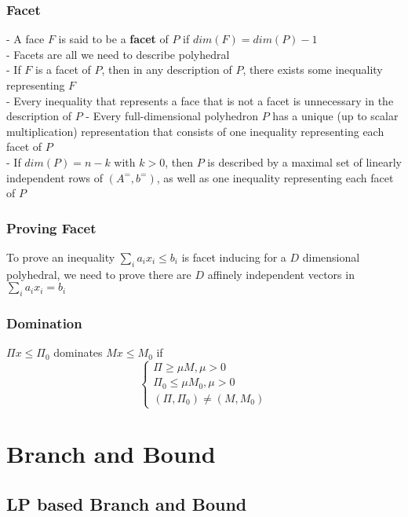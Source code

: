 			\subsection{Facet}
				- A face $F$ is said to be a \textbf{facet} of $P$ if $dim(F) = dim(P)-1$\\
				- Facets are all we need to describe polyhedral\\
				- If $F$ is a facet of $P$, then in any description of $P$, there exists some inequality representing $F$\\
				- Every inequality that represents a face that is not a facet is unnecessary in the description of $P$
				- Every full-dimensional polyhedron $P$ has a unique (up to scalar multiplication) representation that consists of one inequality representing each facet of $P$\\
				- If $dim(P) = n-k$ with $k>0$, then $P$ is described by a maximal set of linearly independent rows of $(A^=, b^=)$, as well as one inequality representing each facet of $P$

			\subsection{Proving Facet}
				To prove an inequality $\sum_i a_i x_i \le b_i$ is facet inducing for a $D$ dimensional polyhedral, we need to prove there are $D$ affinely independent vectors in $\sum_i a_i x_i = b_i$

			\subsection{Domination}
				$\Pi x\le \Pi_0$ dominates $Mx\le M_0$ if
				\begin{equation}
					\begin{cases}
						\Pi \ge \mu M, \mu > 0\\
						\Pi_0 \le \mu M_0, \mu > 0\\
						(\Pi, \Pi_0) \ne (M, M_0)
					\end{cases}
				\end{equation}

	\chapter{Branch and Bound}
		\section{LP based Branch and Bound}
